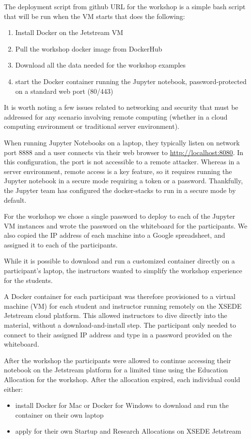 The deployment script from github URL for the workshop is a simple bash script
that will be run when the VM starts that does the following:

\begin{enumerate}
\item Install Docker on the Jetstream VM
\item Pull the workshop docker image from DockerHub
\item Download all the data needed for the workshop examples
\item start the Docker container running the Jupyter notebook, password-protected on a standard web port (80/443)
\end{enumerate}

It is worth noting a few issues related to networking and security that must be
addressed for any scenario involving remote computing (whether in a cloud
computing environment or traditional server environment).

When running Jupyter Notebooks on a laptop, they typically listen on network
port 8888 and a user connects via their web browser to
\url{http://localhost:8080}. In this configuration, the port is not accessible
to a remote attacker. Whereas in a server environment, remote access is a key
feature, so it requires running the Jupyter notebook in a secure mode requiring
a token or a password. Thankfully, the Jupyter team has configured the
docker-stacks to run in a secure mode by default.

For the workshop we chose a single password to deploy to each of the Jupyter VM
instances and wrote the password on the whiteboard for the participants. We also
copied the IP address of each machine into a Google spreadsheet, and assigned it to
each of the participants.

While it is possible to download and run a customized container directly on a
participant’s laptop, the instructors wanted to simplify the workshop
experience for the students.

A Docker container for each participant was therefore provisioned to
a virtual machine (VM) for each student and instructor running remotely on the
XSEDE Jetstream cloud platform. This allowed instructors to dive directly into
the material, without a download-and-install step. The participant only needed
to connect to their assigned IP address and type in a password provided on the
whiteboard.

After the workshop the participants were allowed to continue accessing their
notebook on the Jetstream platform for a limited time using the Education
Allocation for the workshop. After the allocation expired, each individual could
either:

\begin{itemize}

\item install Docker for Mac or Docker for Windows to download and run the
container on their own laptop

\item apply for their own Startup and Research Allocations on XSEDE Jetstream

\end{itemize}
